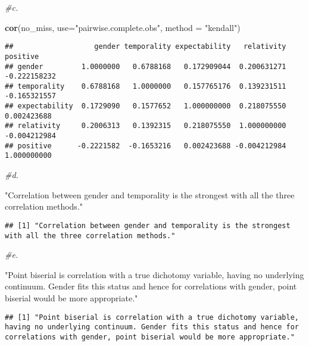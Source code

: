 \documentclass[
]{article}
\newenvironment{Shaded}{\begin{snugshade}}{\end{snugshade}}
\newcommand{\CommentTok}[1]{\textcolor[rgb]{0.56,0.35,0.01}{\textit{#1}}}
\newcommand{\DataTypeTok}[1]{\textcolor[rgb]{0.13,0.29,0.53}{#1}}
\newcommand{\KeywordTok}[1]{\textcolor[rgb]{0.13,0.29,0.53}{\textbf{#1}}}
\newcommand{\NormalTok}[1]{#1}
\newcommand{\StringTok}[1]{\textcolor[rgb]{0.31,0.60,0.02}{#1}}
\begin{document}
\begin{Shaded}
\begin{Highlighting}[]
\CommentTok{#c.}

\KeywordTok{cor}\NormalTok{(no_miss, }\DataTypeTok{use=}\StringTok{"pairwise.complete.obs"}\NormalTok{, }\DataTypeTok{method =} \StringTok{"kendall"}\NormalTok{)}
\end{Highlighting}
\end{Shaded}

\begin{verbatim}
##                   gender temporality expectability   relativity     positive
## gender         1.0000000   0.6788168   0.172909044  0.200631271 -0.222158232
## temporality    0.6788168   1.0000000   0.157765176  0.139231511 -0.165321557
## expectability  0.1729090   0.1577652   1.000000000  0.218075550  0.002423688
## relativity     0.2006313   0.1392315   0.218075550  1.000000000 -0.004212984
## positive      -0.2221582  -0.1653216   0.002423688 -0.004212984  1.000000000
\end{verbatim}

\begin{Shaded}
\begin{Highlighting}[]
\CommentTok{#d.}

\StringTok{"Correlation between gender and temporality is the strongest with all the three correlation methods."}
\end{Highlighting}
\end{Shaded}

\begin{verbatim}
## [1] "Correlation between gender and temporality is the strongest with all the three correlation methods."
\end{verbatim}

\begin{Shaded}
\begin{Highlighting}[]
\CommentTok{#e.}

\StringTok{"Point biserial is correlation with a true dichotomy variable, having no underlying continuum. Gender fits this status and hence for correlations with gender, point biserial would be more appropriate."}
\end{Highlighting}
\end{Shaded}

\begin{verbatim}
## [1] "Point biserial is correlation with a true dichotomy variable, having no underlying continuum. Gender fits this status and hence for correlations with gender, point biserial would be more appropriate."
\end{verbatim}
\end{document}
